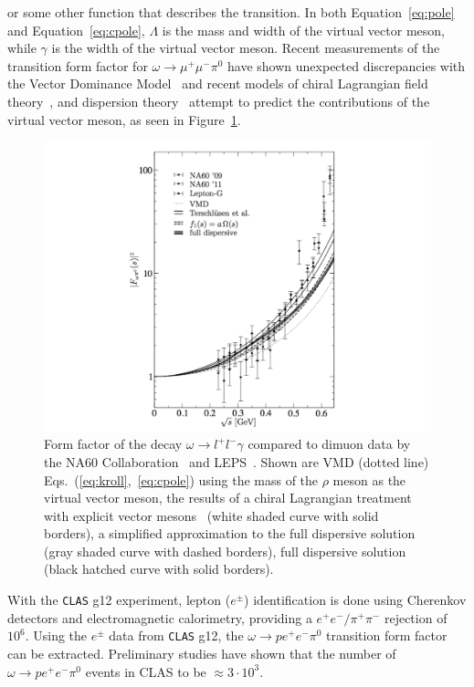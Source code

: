 \documentclass[epj]{webofc}
\begin{document}
  or some other function that describes the transition.
 In both Equation~\ref{eq:pole} and Equation~\ref{eq:cpole}, $\Lambda$ is the mass and width of the virtual vector meson, while $\gamma$ is the width of the virtual vector meson.
 Recent measurements of the transition form factor for $\omega \to \mu^+\mu^- \pi^0$ have shown unexpected discrepancies with the Vector Dominance Model~\cite{bib5} and recent models of chiral Lagrangian field theory~\cite{bib6}, and dispersion theory~\cite{Schneider} attempt to predict the contributions of the virtual vector meson, as seen in Figure~\ref{fig:omega_ff}.
 \begin{figure}[h!]
 	\centerline{\includegraphics[width=250 pt, height=130 pt]{figures/omega_ff_bastian_edit.pdf}}
 	\caption{Form factor of the decay $\omega \to l^+l^- \gamma$ compared to dimuon data by the NA60 Collaboration~\cite{bib5,bib5_0} and LEPS~\cite{LEPS}. Shown are VMD (dotted line) Eqs.~(\ref{eq:kroll},~\ref{eq:cpole}) using the mass of the $\rho$ meson as the virtual vector meson, the results of a chiral Lagrangian treatment with explicit vector mesons~\cite{bib6} (white shaded curve with solid borders), a simplified approximation to the full dispersive solution~\cite{Schneider} (gray shaded curve with dashed borders), full dispersive solution~\cite{Schneider} (black hatched curve with solid borders).~\cite{Schneider}}
 	\label{fig:omega_ff}
 \end{figure}
 
With the \textsc{\texttt{CLAS}} g12 experiment, lepton ($e^{\pm}$) identification is done using Cherenkov detectors and electromagnetic calorimetry, providing a $e^{+}e^{-}/\pi^{+}\pi^{-}$ rejection of $10^6$. Using the $e^{\pm}$ data from \textsc{\texttt{CLAS}} g12, the $ \omega \to p e^+ e^- \pi^0$ transition form factor can be extracted. Preliminary studies have shown that the number of $ \omega \to p e^+ e^- \pi^0$ events in CLAS to be $\approx 3\cdot 10^3$.
\FloatBarrier
\end{document}
